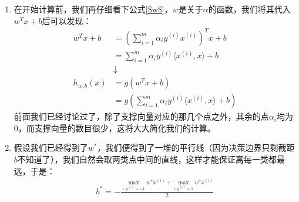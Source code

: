 \begin{enumerate}
	\item 在开始计算前，我们再仔细看下公式\ref{$w$}，$w$是关于$\alpha$的函数，我们将其代入$w^Tx+b$后可以发现：
	\begin{align}
		w^Tx + b &= \left( \sum_{i=1}^{m}\alpha_i y^{(i)}x^{(i)} \right)^Tx + b \\
		&= \sum_{i=1}^{m}\alpha_iy^{(i)}\langle x^{(i)}, x \rangle + b \\
		&\downarrow	\\
		h_{w,b}(x) &= g(w^Tx + b) \\
		&= g(\sum_{i=1}^{m}\alpha_iy^{(i)}\langle x^{(i)}, x \rangle + b)
	\end{align}
	前面我们已经讨论过了，除了支撑向量对应的那几个点之外，其余的点$\alpha_i$均为0，而支撑向量的数目很少，这将大大简化我们的计算。

	\item 假设我们已经得到了$w^*$，我们便得到了一堆的平行线（因为决策边界只剩截距$b$不知道了），我们自然会取两类点中间的直线，这样才能保证离每一类都最远，于是：
	\begin{align}
		b^* = - \frac{\max_{i;y^{(i)}=-1}w^*x^{(i)} + \max_{i;y^{(i)}=1}w^*x^{(i)}}{2}
	\end{align}


\end{enumerate}

















